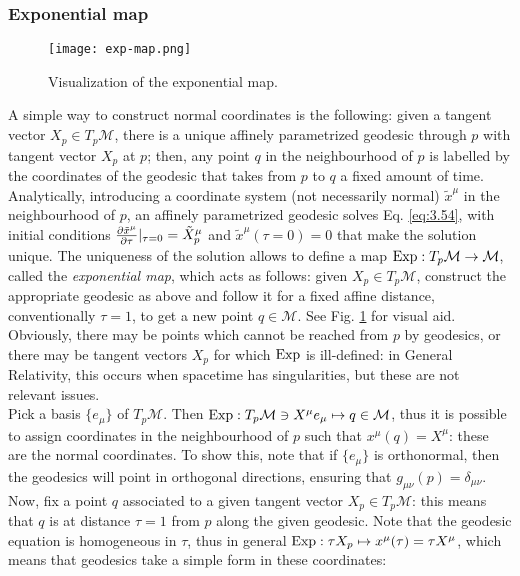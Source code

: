 \subsubsection{Exponential map}

\begin{figure}
  \centering
  \texttt{[image: exp-map.png]}
  \caption{Visualization of the exponential map.}
  \label{exp-map}
\end{figure}

A simple way to construct normal coordinates is the following: given a tangent vector $ X_p \in T_p \mathcal{M} $, there is a unique affinely parametrized geodesic through $ p $ with tangent vector $ X_p $ at $ p $; then, any point $ q $ in the neighbourhood of $ p $ is labelled by the coordinates of the geodesic that takes from $ p $ to $ q $ a fixed amount of time.\\
Analytically, introducing a coordinate system (not necessarily normal) $ \tilde{x}^\mu $ in the neighbourhood of $ p $, an affinely parametrized geodesic solves Eq. \ref{eq:3.54}, with initial conditions $ \frac{\partial \tilde{x}^\mu}{\partial \tau}\vert_{\tau = 0} = \tilde{X}_p^\mu $ and $ \tilde{x}^\mu (\tau = 0) = 0 $ that make the solution unique. The uniqueness of the solution allows to define a map $ \operatorname{Exp} : T_p \mathcal{M} \rightarrow \mathcal{M} $, called the \textit{exponential map}, which acts as follows: given $ X_p \in T_p \mathcal{M} $, construct the appropriate geodesic as above and follow it for a fixed affine distance, conventionally $ \tau = 1 $, to get a new point $ q \in \mathcal{M} $. See Fig. \ref{exp-map} for visual aid. Obviously, there may be points which cannot be reached from $ p $ by geodesics, or there may be tangent vectors $ X_p $ for which $ \operatorname{Exp} $ is ill-defined: in General Relativity, this occurs when spacetime has singularities, but these are not relevant issues.\\
Pick a basis $ \{e_\mu\} $ of $ T_p \mathcal{M} $. Then $ \operatorname{Exp} : T_p \mathcal{M} \ni X^\mu e_\mu \mapsto q \in \mathcal{M} $, thus it is possible to assign coordinates in the neighbourhood of $ p $ such that $ x^\mu(q) = X^\mu $: these are the normal coordinates. To show this, note that if $ \{e_\mu\} $ is orthonormal, then the geodesics will point in orthogonal directions, ensuring that $ g_{\mu \nu}(p) = \delta_{\mu \nu} $. Now, fix a point $ q $ associated to a given tangent vector $ X_p \in T_p \mathcal{M} $: this means that $ q $ is at distance $ \tau = 1 $ from $ p $ along the given geodesic. Note that the geodesic equation is homogeneous in $ \tau $, thus in general $ \operatorname{Exp} : \tau X_p \mapsto x^\mu(\tau) = \tau X^\mu $, which means that geodesics take a simple form in these coordinates:
